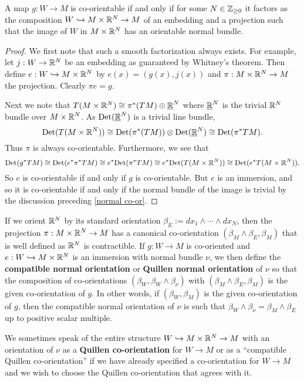 \begin{lemma}\label{L: Quillen}
A map $g:W\to M$ is co-orientable if and only if for some $N\in \mathbb{Z}_{\geq 0}$ it factors as the composition $W\hookrightarrow M\times \mathbb{R}^N \to M$ of an embedding and a projection   such that the image of $W$ in $M\times \mathbb{R}^N$ has an orientable normal bundle.
\end{lemma}
\begin{proof}
We first note that such a smooth factorization always exists. For example, let $j:W\to \mathbb{R}^N$ be an embedding as guaranteed by Whitney's theorem. Then define $e:W\hookrightarrow M\times \mathbb{R}^N$ by $e(x)=(g(x),j(x))$ and  $\pi:M\times \mathbb{R}^N\to M$ the projection. Clearly $\pi e=g$.

Next we note that  $T(M\times \mathbb{R}^N)\cong \pi^*(TM)\oplus \underline{\mathbb{R}}^N$ where $\underline{\mathbb{R}}^N$ is the trivial $\mathbb{R}^N$ bundle over $M\times \mathbb{R}^N$. As $ {\rm Det}( \underline{\mathbb{R}}^N)$ is a trivial line bundle,
 $${\rm Det}(T(M\times \mathbb{R}^N))\cong {\rm Det}( \pi^*(TM)) \otimes {\rm Det}(\underline{\mathbb{R}}^N)\cong {\rm Det}(\pi^*TM).$$ Thus  $\pi$ is always co-orientable. Furthermore, we see that
$${\rm Det}(g^*TM)\cong {\rm Det}(e^*\pi^*TM)\cong e^*{\rm Det}(\pi^*TM)\cong e^*{\rm Det}(T(M\times \mathbb{R}^N))\cong {\rm Det}(e^*T(M\times \mathbb{R}^N)).$$ So $e$ is co-orientable if and only if $g$ is co-orientable. But
 $e$ is an immersion, and so it is co-orientable if and only if the normal bundle of the image is trivial by the discussion preceding \cref{normal co-or}.
\end{proof}







\begin{definition}\label{D: Quillen normal or}
If we orient  $\mathbb{R}^N$ by its standard orientation $\beta_E:= dx_1\wedge\cdots\wedge dx_N$, then the projection $\pi:M\times \mathbb{R}^N\to M$ has a canonical co-orientation $(\beta_M\wedge \beta_E,\beta_M)$ that is well defined as $\mathbb{R}^N$ is contractible. If $g:W\to M$ is co-oriented and $e:W\hookrightarrow M\times \mathbb{R}^N$ is an immersion with normal bundle $\nu$, we then define the \textbf{compatible normal orientation} or \textbf{Quillen normal orientation} of $\nu$ so that the composition of co-orientations $(\beta_W,\beta_W\wedge \beta_\nu)$ with $(\beta_M\wedge \beta_E,\beta_M)$ is the given co-orientation of $g$. In other words, if $(\beta_W,\beta_M)$ is the given co-orientation of $g$, then the compatible normal orientation of $\nu$ is such that $\beta_W\wedge \beta_\nu=
\beta_M\wedge \beta_E$ up to positive scalar multiple.

We sometimes speak of the entire structure $W\hookrightarrow M\times \mathbb{R}^N\to M$ with an orientation of $\nu$ as a \textbf{Quillen co-orientation} for $W\to M$ or as a ``compatible Quillen co-orientation'' if we have already specified a co-orientation for $W\to M$ and we wish to choose the Quillen co-orientation that agrees with it.
\end{definition}

